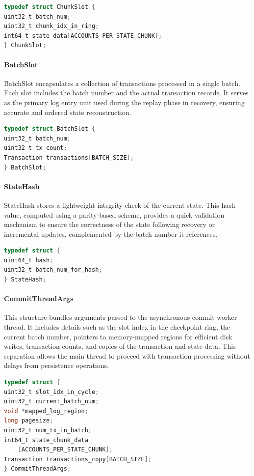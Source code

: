 \documentclass[conference]{IEEEtran}
\begin{document}
\begin{lstlisting}[language=C]
typedef struct ChunkSlot {
uint32_t batch_num;
uint32_t chunk_idx_in_ring;
int64_t state_data[ACCOUNTS_PER_STATE_CHUNK];
} ChunkSlot;
\end{lstlisting}

\paragraph{BatchSlot}
BatchSlot encapsulates a collection of transactions processed in a single batch. Each slot includes the batch number and the actual transaction records. It serves as the primary log entry unit used during the replay phase in recovery, ensuring accurate and ordered state reconstruction.

\begin{lstlisting}[language=C]
typedef struct BatchSlot {
uint32_t batch_num;
uint32_t tx_count;
Transaction transactions[BATCH_SIZE];
} BatchSlot;
\end{lstlisting}

\paragraph{StateHash}
StateHash stores a lightweight integrity check of the current state. This hash value, computed using a parity-based scheme, provides a quick validation mechanism to ensure the correctness of the state following recovery or incremental updates, complemented by the batch number it references.

\begin{lstlisting}[language=C]
typedef struct {
uint64_t hash;
uint32_t batch_num_for_hash;
} StateHash;
\end{lstlisting}

\paragraph{CommitThreadArgs}
This structure bundles arguments passed to the asynchronous commit worker thread. It includes details such as the slot index in the checkpoint ring, the current batch number, pointers to memory-mapped regions for efficient disk writes, transaction counts, and copies of the transaction and state data. This separation allows the main thread to proceed with transaction processing without delays from persistence operations.

\begin{lstlisting}[language=C]
typedef struct {
uint32_t slot_idx_in_cycle;
uint32_t current_batch_num;
void *mapped_log_region;
long pagesize;
uint32_t num_tx_in_batch;
int64_t state_chunk_data
    [ACCOUNTS_PER_STATE_CHUNK];
Transaction transactions_copy[BATCH_SIZE];
} CommitThreadArgs;
\end{lstlisting}
\end{document}
